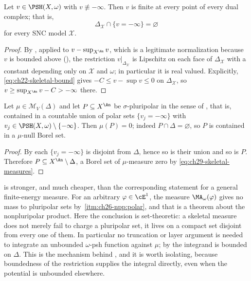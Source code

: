 \begin{proposition}
\label{prop:ch29-skeleton-not-polar}
Let $v\in\PSH(X,\omega)$ with $v\not\equiv-\infty$.  Then
$v$ is finite at every point of every dual complex; that is,
\[
 \Delta_{\mathcal X}\cap\{v=-\infty\}=\varnothing
\]
for every SNC model $\mathcal X$.
\end{proposition}

\begin{proof}
By , applied to
$v-\sup_{X^{\An}}v$, which is a legitimate normalization because $v$ is
bounded above (), the restriction
$v|_{\Delta_{\mathcal X}}$ is Lipschitz on each face of
$\Delta_{\mathcal X}$ with a constant depending only on
$\mathcal X$ and $\omega$; in particular it is real valued.  Explicitly,
\eqref{eq:ch22-skeletal-bound} gives
$-C\leq v-\sup v\leq0$ on $\Delta_{\mathcal X}$, so
$v\geq\sup_{X^{\An}}v-C>-\infty$ there.
\end{proof}

\begin{proposition}
\label{prop:ch29-supported-no-polar-mass}
Let $\mu\in\mathcal M_V(\Delta)$ and let
$P\subseteq X^{\An}$ be $\sigma$-pluripolar in the sense of
, that is, contained in a countable union of polar sets $\{v_j=-\infty\}$ with
$v_j\in\PSH(X,\omega)\setminus\{-\infty\}$.  Then $\mu(P)=0$; indeed
$P\cap\Delta=\varnothing$, so $P$ is contained in a $\mu$-null Borel
set.
\end{proposition}

\begin{proof}
By  each $\{v_j=-\infty\}$ is disjoint
from $\Delta$, hence so is their union and so is $P$.  Therefore
$P\subseteq X^{\An}\setminus\Delta$, a Borel set of $\mu$-measure zero
by \eqref{eq:ch29-skeletal-measures}.
\end{proof}

\begin{remark}
\label{rem:ch29-two-polar-statements}
 is stronger, and much cheaper,
than the corresponding statement for a general finite-energy measure.  For
an arbitrary $\varphi\in\cE^1$, the measure $\MA_\omega(\varphi)$ gives
no mass to pluripolar sets by
\,\cref{itm:ch26-npp:polar}, and that is a theorem
about the nonpluripolar product.  Here the conclusion is set-theoretic: a
skeletal measure does not merely fail to charge a pluripolar set, it lives
on a compact set disjoint from every one of them.  In particular no
truncation or layer argument is needed to integrate an unbounded
$\omega$-psh function against $\mu$; by
 the integrand is bounded on
$\Delta$.  This is the mechanism behind
, and it is worth isolating,
because boundedness of the restriction supplies the integral directly,
even when the potential is unbounded elsewhere.
\end{remark}

